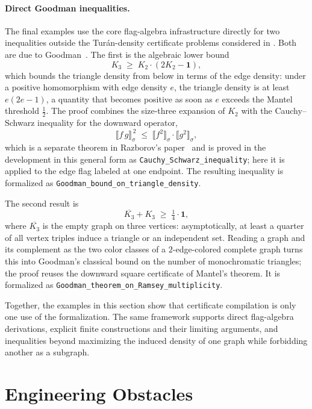 \documentclass{article}
\newcommand{\lean}[1]{\texttt{#1}}
\begin{document}
\paragraph{Direct Goodman inequalities.}
The final examples use the core flag-algebra infrastructure directly for two
inequalities outside the Tur\'an-density certificate problems considered in
.  Both are due to Goodman~\cite{goodman1959}.
The first is the algebraic lower bound
\[
  K_3 \;\geq\; K_2\cdot(2K_2-\mathbf{1}),
\]
which bounds the triangle density from below in terms of the edge density:
under a positive homomorphism with edge density $e$, the triangle density is
at least $e(2e-1)$, a quantity that becomes positive as soon as $e$ exceeds
the Mantel threshold $\tfrac12$.  The proof combines the size-three expansion
of $K_2$ with the Cauchy--Schwarz inequality for the downward operator,
\[
  \llbracket f\,g\rrbracket_\sigma^{\,2}
  \;\leq\;
  \llbracket f^2\rrbracket_\sigma\cdot\llbracket g^2\rrbracket_\sigma,
\]
which is a separate theorem in Razborov's paper~\cite{razborov2007flag} and
is proved in the development in this general form as
\lean{Cauchy\_\allowbreak Schwarz\_\allowbreak inequality}; here it is
applied to the edge flag labeled at one endpoint.  The resulting inequality is
formalized as
\lean{Goodman\_\allowbreak bound\_\allowbreak on\_\allowbreak triangle\_\allowbreak density}.

The second result is
\[
  \overline{K_3} + K_3 \;\geq\; \tfrac14\cdot\mathbf{1},
\]
where $\overline{K_3}$ is the empty graph on three vertices: asymptotically,
at least a quarter of all
vertex triples induce a triangle or an independent set.  Reading a graph and
its complement as the two color classes of a $2$-edge-colored complete graph
turns this into Goodman's classical bound on the number of monochromatic
triangles; the proof reuses the downward square certificate of Mantel's
theorem.  It is formalized as
\lean{Goodman\_theorem\_on\_Ramsey\_multiplicity}.

Together, the examples in this section show that certificate compilation is
only one use of the formalization.  The same framework supports direct
flag-algebra derivations, explicit finite constructions and their limiting
arguments, and inequalities beyond maximizing the induced density of one graph
while forbidding another as a subgraph.

\section{Engineering Obstacles}
\label{sec:obstacles}
\end{document}
